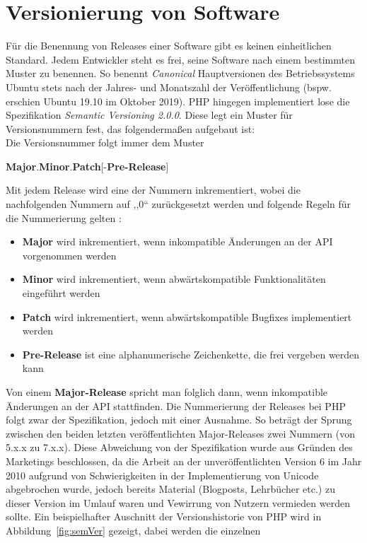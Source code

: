 \section{Versionierung von Software}
Für die Benennung von Releases einer Software gibt es keinen einheitlichen Standard. Jedem Entwickler steht es frei, seine
Software nach einem bestimmten Muster zu benennen. So benennt \textit{Canonical} Hauptversionen des Betriebssystems Ubuntu stets nach der 
Jahres- und Monatszahl der Veröffentlichung (bspw. erschien Ubuntu 19.10 im Oktober 2019). \ac{PHP} hingegen implementiert
lose die Spezifikation \textit{Semantic Versioning 2.0.0}. Diese legt ein Muster für Versionsnummern fest, das 
folgendermaßen aufgebaut ist: \\
Die Versionsnummer folgt immer dem Muster \\ \centerline{\textbf{Major}.\textbf{Minor}.\textbf{Patch}{[-\textbf{Pre-Release}]}}
Mit jedem Release wird eine der Nummern inkrementiert, wobei die nachfolgenden Nummern auf ,,0`` zurückgesetzt werden 
und folgende Regeln für die Nummerierung gelten \cite{preston-werner_semantic_nodate}:
\begin{itemize}
    \item \textbf{Major} wird inkrementiert, wenn inkompatible Änderungen an der API vorgenommen werden
    \item \textbf{Minor} wird inkrementiert, wenn abwärtskompatible Funktionalitäten eingeführt werden
    \item \textbf{Patch} wird inkrementiert, wenn abwärtskompatible Bugfixes implementiert werden
    \item \textbf{Pre-Release} ist eine alphanumerische Zeichenkette, die frei vergeben werden kann
\end{itemize}
Von einem \textbf{Major-Release} spricht man folglich dann, wenn inkompatible Änderungen an der API stattfinden. 
Die Nummerierung der Releases bei \ac{PHP} folgt zwar der Spezifikation, jedoch mit einer Ausnahme. So beträgt der 
Sprung zwischen den beiden letzten veröffentlichten Major-Releases zwei Nummern (von 5.x.x zu 7.x.x). Diese Abweichung 
von der Spezifikation wurde aus Gründen des Marketings beschlossen, da die Arbeit an der unveröffentlichten Version 6 
im Jahr 2010 aufgrund von Schwierigkeiten in der Implementierung von Unicode abgebrochen wurde, jedoch bereits Material 
(Blogposts, Lehrbücher etc.) zu dieser Version im Umlauf waren und Vewirrung von Nutzern vermieden werden sollte.
Ein beispielhafter Auschnitt der Versionshistorie von \ac{PHP} wird in Abbildung~\ref{fig:semVer} gezeigt, dabei werden die einzelnen
